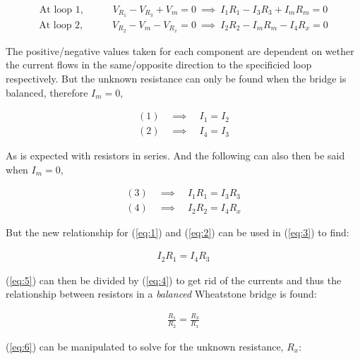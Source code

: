 \documentclass[12pt]{article}
\begin{document}
\vspace{-2ex}
\begin{gather} \label{eq:3}
    \text{At loop 1,} \qquad\quad V_{R_1} - V_{R_3} + V_m = 0 \: \implies \: I_1R_1 - I_3R_3 + I_mR_m = 0
\end{gather}
\vspace{-5ex}
\begin{gather} \label{eq:4}
    \text{At loop 2,} \qquad\quad V_{R_2} - V_m - V_{R_x} = 0 \: \implies \: I_2R_2 - I_mR_m - I_4R_x = 0
\end{gather}

The positive/negative values taken for each component are dependent on wether the current flows in the same/opposite direction to the specificied loop respectively.
But the unknown resistance can only be found when the bridge is balanced, therefore $I_m = 0$,

\vspace{-2ex}
\begin{align*}
    (1) \quad \implies \quad I_1 = I_2 \\
    (2) \quad \implies \quad I_4 = I_3
\end{align*}

As is expected with resistors in series. And the following can also then be said when $I_m=0$,

\vspace{-2ex}
\begin{align*}
    (3) \quad \implies \quad I_1R_1 = I_3R_3 \\
    (4) \quad \implies \quad I_2R_2 = I_4R_x
\end{align*}

But the new relationship for (\ref{eq:1}) and (\ref{eq:2}) can be used in (\ref{eq:3}) to find:

\vspace{-2ex}
\begin{gather} \label{eq:5}
    I_2R_1 = I_4R_3
\end{gather}

(\ref{eq:5}) can then be divided by (\ref{eq:4}) to get rid of the currents and thus the relationship between resistors in a \textit{balanced} Wheatstone bridge is found:

\vspace{-2ex}
\begin{gather} \label{eq:6}
    \frac{R_1}{R_2} = \frac{R_3}{R_x}
\end{gather}

(\ref{eq:6}) can be manipulated to solve for the unknown resistance, $R_x$:
\end{document}
